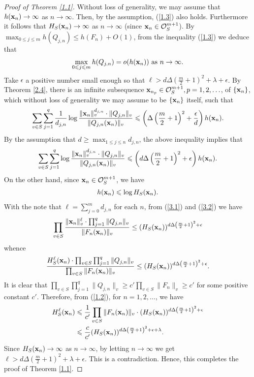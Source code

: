 \documentclass[12pt,leqno]{amsart}
\numberwithin{equation}{section}
\begin{document}
\begin{proof}[Proof of Theorem \ref{1.1}]
Without loss of generality, we may assume that $h({\bf x}_{n})\rightarrow \infty$ as $n\rightarrow \infty$. Then, by the assumption, (\ref{1.3}) also holds. Furthermore it follows that $H_{S}({\bf x}_{n})\rightarrow \infty$ as $n\rightarrow \infty$ (since ${\bf x}_n\in\mathcal{O}_{S}^{m+1}$). By $\max _{0\leqslant j\leqslant m}h(Q_{j, n}) \leqslant h(F_{n})+O(1)$, from the inequality (\ref{1.3}) we deduce that 
$$\max _{0\leqslant j\leqslant m}h(Q_{j, n})=o(h({\bf x}_{n})) \text { as } n\rightarrow \infty.$$
Take $\epsilon$ a positive number small enough so that $\ell>d\Delta\left(\frac{m}{2}+1\right)^{2}+\lambda+\epsilon$.
By Theorem \ref{2.4}, there is an infinite subsequence ${\bf x}_{n_p}\in \mathcal{O}_{S}^{m+1},p=1,2, \ldots$, of $\{{\bf x}_{n}\}$, which without loss of generality we may assume to be $\{{\bf x}_{n}\}$ itself, such that
$$\sum_{v \in S} \sum_{j=1}^{q}\dfrac{1}{d_{j,n}} \log \frac{\|{\bf x}_{n}\|_{v}^{d_{j,n}} \cdot\|Q_{j, n}\|_{v}}{\|Q_{j, n}({\bf x}_{n})\|_{v}} \leqslant \left(\Delta\left(\frac{m}{2}+1\right)^{2}+\frac{\epsilon}{d}\right) h({\bf x}_{n}).$$
By the assumption that $d\geqslant \max_{1\leqslant j\leqslant n}d_{j,n}$, the above inequality implies that
\begin{align}\label{3.1}
\sum_{v \in S} \sum_{j=1}^{q}\log \frac{\|{\bf x}_{n}\|_{v}^{d_{j,n}}\cdot\|Q_{j, n}\|_{v}}{\|Q_{j, n}({\bf x}_{n})\|_{v}} \leqslant \left(d\Delta\left(\frac{m}{2}+1\right)^{2}+\epsilon\right) h({\bf x}_{n}).
\end{align}
On the other hand, since ${\bf x}_{n} \in \mathcal{O}_{S}^{m+1}$, we have
\begin{align}\label{3.2}
h({\bf x}_{n}) \leqslant \log H_{S}({\bf x}_{n}).
\end{align}
With the note that $\ell=\sum_{j=0}^md_{j,n}$ for each $n$, from (\ref{3.1}) and (\ref{3.2}) we have 
$$\prod_{v \in S} \frac{\|{\bf x}_{n}\|_{v}^{\ell} \cdot \prod_{j=1}^{q}\|Q_{j, n}\|_{v}}{\|F_{n}({\bf x}_{n})\|_{v}} \leq(H_{S}({\bf x}_{n}))^{d\Delta\left(\frac{m}{2}+1\right)^{2}+\epsilon}$$
whence
$$\frac{H_{S}^{\ell}({\bf x}_{n}) \cdot \prod_{v \in S} \prod_{j=1}^{q}\|Q_{j, n}\|_{v}}{\prod_{v \in S}\|F_{n}({\bf x}_{n})\|_{v}} \leq(H_{S}({\bf x}_{n}))^{d\Delta\left(\frac{m}{2}+1\right)^{2}+\epsilon}.$$
It is clear that $\prod_{v \in S} \prod_{j=1}^{q}\|Q_{j, n}\|_{v} \geq c' \prod_{v \in S}\|F_{n}\|_{v} \geq c'$ for some positive constant $c'$.
Therefore, from (\ref{1.2}), for $n=1,2, \ldots$, we have
\begin{align*}
H_{S}^{\ell}({\bf x}_{n})&\leqslant \frac{1}{c'} \prod_{v \in S}\|F_{n}({\bf x}_{n})\|_{v} \cdot(H_{S}({\bf x}_{n}))^{d\Delta\left(\frac{m}{2}+1\right)^{2}+\epsilon}\\ 
&\leqslant \frac{c}{c'}(H_{S}({\bf x}_{n}))^{d\Delta\left(\frac{m}{2}+1\right)^{2}+\epsilon+\lambda}. 
\end{align*}
Since $H_{S}({\bf x}_{n})\rightarrow \infty$ as $n\rightarrow \infty$, by letting $n\rightarrow \infty$ we get $\ell>d\Delta(\frac{m}{2}+1)^{2}+\lambda+\epsilon$. This is a contradiction. Hence, this completes the proof of Theorem \ref{1.1}.
\end{proof}
\end{document}
